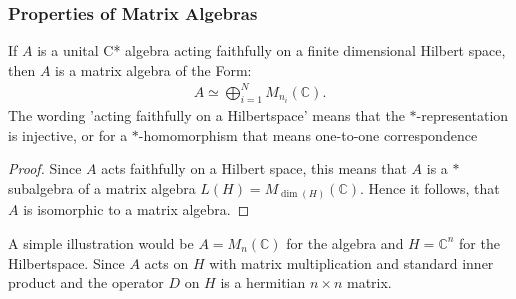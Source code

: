 \subsubsection{Properties of Matrix Algebras}
\begin{mylemma}
    If $A$ is a unital C* algebra acting faithfully on a finite
    dimensional Hilbert space, then $A$ is a matrix algebra of the Form:
    \begin{align}
        A \simeq \bigoplus _{i=1}^N M_{n_i}(\mathbb{C}).
    \end{align}
    The wording 'acting faithfully on a Hilbertspace' means that the
    $*$-representation is injective, or for a $*$-homomorphism that means
    one-to-one correspondence
\end{mylemma}
\begin{proof}
    Since $A$ acts faithfully on a Hilbert
    space, this means that $A$ is a $*$ subalgebra of a matrix algebra $L(H) = M_{\dim
    (H)}(\mathbb{C})$. Hence it follows, that $A$ is isomorphic to a matrix
    algebra.
\end{proof}

A simple illustration would be $A = M_n(\mathbb{C})$ for the algebra and
$H=\mathbb{C}^n$ for the Hilbertspace. Since $A$ acts on $H$ with matrix
multiplication and standard inner product and the operator $D$ on $H$ is a
hermitian $n\times n$ matrix.

